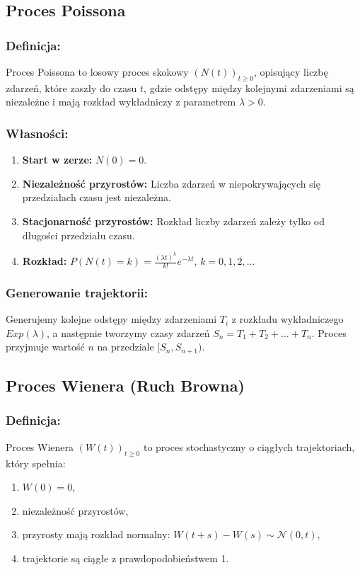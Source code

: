 \subsection{Proces Poissona}
\subsubsection*{Definicja:}
Proces Poissona to losowy proces skokowy $(N(t))_{t \geq 0}$, opisujący liczbę zdarzeń, które zaszły do czasu $t$, gdzie odstępy między kolejnymi zdarzeniami są niezależne i mają rozkład wykładniczy z parametrem $\lambda > 0$.

\subsubsection*{Własności:}

\begin{enumerate}
    \item \textbf{Start w zerze:} $N(0) = 0$.
    \item \textbf{Niezależność przyrostów:} Liczba zdarzeń w niepokrywających się przedziałach czasu jest niezależna.
    \item \textbf{Stacjonarność przyrostów:} Rozkład liczby zdarzeń zależy tylko od długości przedziału czasu.
    \item \textbf{Rozkład:} $P(N(t) = k) = \frac{(\lambda t)^k}{k!} e^{-\lambda t}$, $k = 0,1,2,\dots$
\end{enumerate}

\subsubsection*{Generowanie trajektorii:}
Generujemy kolejne odstępy między zdarzeniami $T_i$ z rozkładu wykładniczego $Exp(\lambda)$, a następnie tworzymy czasy zdarzeń $S_n = T_1 + T_2 + \dots + T_n$. Proces przyjmuje wartość $n$ na przedziale $[S_n, S_{n+1})$.

\subsection{Proces Wienera (Ruch Browna)}
\subsubsection*{Definicja:}
Proces Wienera $(W(t))_{t \geq 0}$ to proces stochastyczny o ciągłych trajektoriach, który spełnia:

\begin{enumerate}
    \item $W(0) = 0$,
    \item niezależność przyrostów,
    \item przyrosty mają rozkład normalny: $W(t+s) - W(s) \sim \mathcal{N}(0, t)$,
    \item trajektorie są ciągłe z prawdopodobieństwem 1.
\end{enumerate}

